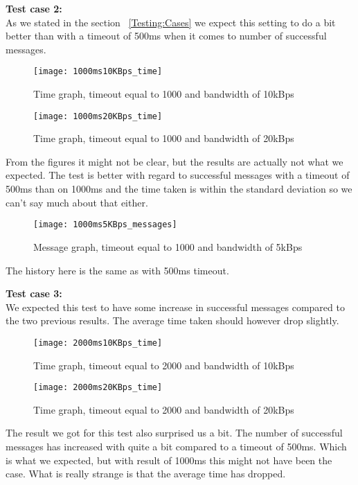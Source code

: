     \textbf{Test case 2:}\\
    As we stated in the section ~\ref{Testing:Cases} we expect this setting to do a bit better than with a timeout of 500ms when it comes to number of successful messages.
    \begin{figure}[H]
		\centering
		\texttt{[image: 1000ms10KBps\_time]}
		\caption{Time graph, timeout equal to 1000 and bandwidth of 10kBps} 
		\label{figure:results:1000ms10KBps_time}
	\end{figure}
	
	\begin{figure}[H]
		\centering
		\texttt{[image: 1000ms20KBps\_time]}
		\caption{Time graph, timeout equal to 1000 and bandwidth of 20kBps} 
		\label{figure:results:1000ms20KBps_time}
	\end{figure}
	
	From the figures it might not be clear, but the results are actually not what we expected. The test is better with regard to successful messages with a timeout of 500ms than on 1000ms and the time taken is within the standard deviation so we can't say much about that either.
	
	\begin{figure}[H]
		\centering
		\texttt{[image: 1000ms5KBps\_messages]}
		\caption{Message graph, timeout equal to 1000 and bandwidth of 5kBps} 
		\label{figure:results:1000ms5KBps_messages}
	\end{figure}
	
	The history here is the same as with 500ms timeout.
    
    \textbf{Test case 3:}\\
    We expected this test to have some increase in successful messages compared to the two previous results. The average time taken should however drop slightly.
    \begin{figure}[H]
		\centering
		\texttt{[image: 2000ms10KBps\_time]}
		\caption{Time graph, timeout equal to 2000 and bandwidth of 10kBps} 
		\label{figure:results:2000ms10KBps_time}
	\end{figure}
	
	\begin{figure}[H]
		\centering
		\texttt{[image: 2000ms20KBps\_time]}
		\caption{Time graph, timeout equal to 2000 and bandwidth of 20kBps} 
		\label{figure:results:2000ms20KBps_time}
	\end{figure}
	
	The result we got for this test also surprised us a bit. The number of successful messages has increased with quite a bit compared to a timeout of 500ms. Which is what we expected, but with result of 1000ms this might not have been the case. What is really strange is that the average time has dropped.
	
